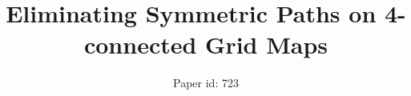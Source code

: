 \documentclass{article}
\begin{document}
\title{Eliminating Symmetric Paths on 4-connected Grid Maps}
\author{Paper id: 723}


\maketitle




 





%



\end{document}
